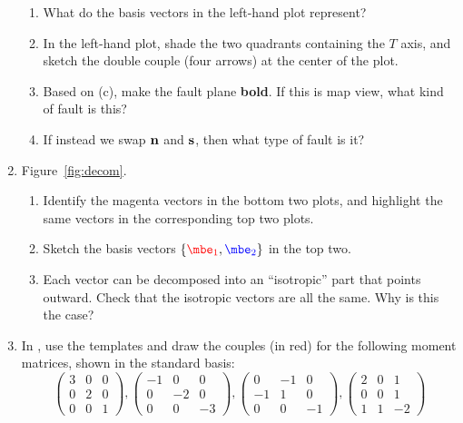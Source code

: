 \documentclass[11pt,titlepage,fleqn]{article}
\newcommand{\eone}{\textcolor{red}{\mbe_1}}
\newcommand{\etwo}{\textcolor{blue}{\mbe_2}}
\begin{document}
\begin{enumerate}
\begin{enumerate}
\item What do the basis vectors in the left-hand plot represent?

\item In the left-hand plot, shade the two quadrants containing the $T$ axis, and sketch the double couple (four arrows) at the center of the plot.

\item Based on (c), make the fault plane {\bf bold}. If this is map view, what kind of fault is this?

\item If instead we swap $\mbox{${\bf n}$}$ and $\mbox{${\bf s}$}$, then what type of fault is it?
\end{enumerate}


\item 
\label{prob:decom}
Figure~\ref{fig:decom}.
%
\begin{enumerate}
\item Identify the magenta vectors in the bottom two plots, and highlight the same vectors in the corresponding top two plots.
\item Sketch the basis vectors $\{\eone,\etwo\}$ in the top two.
\item Each vector can be decomposed into an ``isotropic'' part that points outward. Check that the isotropic vectors are all the same. Why is this the case?
\end{enumerate}


\item 
\label{prob:arrows}
In , use the templates and draw the couples (in red) for the following moment matrices, shown in the standard basis:
%
\begin{equation*}
\begin{pmatrix} 3 &  0 & 0 \\  0 & 2 & 0 \\ 0 & 0 &  1 \end{pmatrix},
\begin{pmatrix} -1 &  0 & 0 \\  0 & -2 & 0 \\ 0 & 0 & -3 \end{pmatrix},
\begin{pmatrix} 0 & -1 & 0 \\ -1 & 1 & 0 \\ 0 & 0 & -1 \end{pmatrix},
\begin{pmatrix} 2 &  0 & 1 \\  0 & 0 & 1 \\ 1 & 1 & -2 \end{pmatrix}
\end{equation*}


\end{enumerate}
\end{document}
